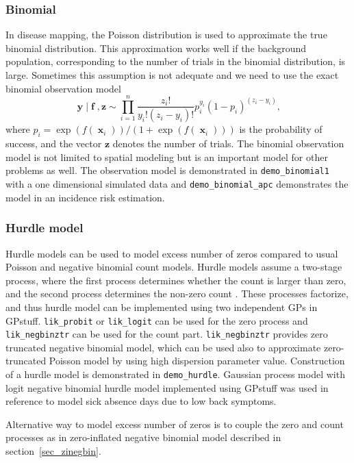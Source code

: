 \documentclass[twoside,11pt]{article}
\DeclareMathOperator{\x}{\mathbf{x}}
\DeclareMathOperator{\f}{\mathbf{f}}
\DeclareMathOperator{\y}{\mathbf{y}}
\newcommand{\pkg}[1]{{\fontseries{b}\selectfont #1}}
\newcommand{\code}[1]{{\normalfont\texttt{#1}}}
\begin{document}
\subsubsection{Binomial}

In disease mapping, the Poisson distribution is used to approximate
the true binomial distribution. This approximation works well if the
background population, corresponding to the number of trials in the
binomial distribution, is large. Sometimes this assumption is not
adequate and we need to use the exact binomial observation model
%
\begin{equation}
\y|\f,\mathbf{z} \sim \prod_{i=1}^n \frac{z_i!}{y_i!(z_i-y_i)!} p_i^{y_i}(1-p_i)^{(z_i-y_i)},
\end{equation}
%
where $p_i = \exp(f(\x_i))/ (1+\exp(f(\x_i)))$ is the probability of
success, and the vector $\mathbf{z}$ denotes the number of trials. The
binomial observation model is not limited to spatial modeling but is
an important model for other problems as well. The observation model
is demonstrated in \code{demo\_binomial1} with a one dimensional
simulated data and \code{demo\_binomial\_apc} demonstrates the model in an
incidence risk estimation.

\subsubsection{Hurdle model}
\label{sec_hurdle}

Hurdle models can be used to model excess number of zeros compared
to usual Poisson and negative binomial count models. Hurdle models
assume a two-stage process, where the first process determines
whether the count is larger than zero, and the second process
determines the non-zero count \citep{Mullahy:1986}. These processes
factorize, and thus hurdle model can be implemented using two
independent GPs in GPstuff. \code{lik\_probit} or \code{lik\_logit}
can be used for the zero process and \code{lik\_negbinztr} can be
used for the count part. \code{lik\_negbinztr} provides zero
truncated negative binomial model, which can be used also to
approximate zero-truncated Poisson model by using high dispersion
parameter value. Construction of a hurdle model is demonstrated in
\code{demo\_hurdle}. Gaussian process model with logit negative
binomial hurdle model implemented using \pkg{GPstuff} was used in
reference \citep{Rantonen+etal:2011} to model sick absence days due
to low back symptoms.

Alternative way to model excess number of zeros is to couple the zero
and count processes as in zero-inflated negative binomial model
described in section~\ref{sec_zinegbin}.
\end{document}
